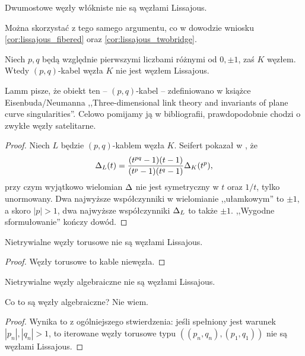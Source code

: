 \begin{corollary}
%
    Dwumostowe węzły włókniste nie są węzłami Lissajous.
\end{corollary}

Można skorzystać z tego samego argumentu, co w dowodzie wniosku \ref{cor:lissajous_fibered} oraz \ref{cor:lissajous_twobridge}.

\begin{proposition}
    Niech $p, q$ będą względnie pierwszymi liczbami różnymi od $0, \pm 1$, zaś $K$ węzłem.
    Wtedy $(p, q)$-kabel węzła $K$ nie jest węzłem Lissajous.
\end{proposition}

Lamm pisze, że obiekt ten -- $(p, q)$-kabel -- zdefiniowano w książce Eisenbuda/Neumanna ,,Three-dimensional link theory and invariants of plane curve singularities''.
%
%
Celowo pomijamy ją w bibliografii, prawdopodobnie chodzi o zwykłe węzły satelitarne.

\begin{proof}
%
    Niech $L$ będzie $(p, q)$-kablem węzła $K$.
    Seifert pokazał w \cite{seifert50}, że
    \begin{equation}
        \Delta_L(t) = \frac{(t^{pq}-1)(t-1)}{(t^p-1)(t^q-1)} \Delta_K(t^p),
    \end{equation}
    przy czym wyjątkowo wielomian $\Delta$ nie jest symetryczny w $t$ oraz $1/t$, tylko unormowany.
    Dwa najwyższe współczynniki w wielomianie ,,ułamkowym'' to $\pm 1$, a skoro $|p| > 1$, dwa najwyższe współczynniki $\Delta_L$ to także $\pm 1$.
    ,,Wygodne sformułowanie'' kończy dowód.
\end{proof}

\begin{corollary}
%
    Nietrywialne węzły torusowe nie są węzłami Lissajous.
\end{corollary}

\begin{proof}
    Węzły torusowe to kable niewęzła.
\end{proof}

\begin{corollary}
    Nietrywialne węzły algebraiczne nie są węzłami Lissajous.
\end{corollary}

Co to są węzły algebraiczne?
Nie wiem.

\begin{proof}
    Wynika to z ogólniejszego stwierdzenia: jeśli spełniony jest warunek $|p_n|, |q_n| > 1$, to iterowane węzły torusowe typu $((p_n, q_n), (p_1, q_1))$ nie są węzłami Lissajous.
\end{proof}

